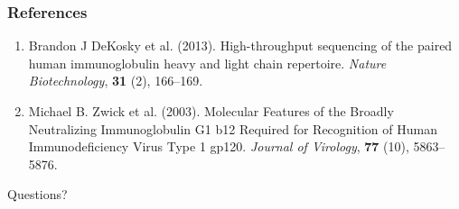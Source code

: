 \documentclass[mathserif,compress]{beamer}
\renewcommand\;{\,}
\begin{document}
\begin{frame}\frametitle{References}
\begin{enumerate}
\item
Brandon J DeKosky et al. (2013).
High-throughput sequencing of the paired human
immunoglobulin heavy and light chain repertoire.
\emph{Nature Biotechnology}, \textbf{31} (2), 166--169.
\bigskip
\item
Michael B. Zwick et al. (2003).
Molecular Features of the Broadly Neutralizing Immunoglobulin G1 b12 Required for Recognition of Human Immunodeficiency Virus Type 1 gp120.
\emph{Journal of Virology}, \textbf{77} (10), 5863--5876.
\end{enumerate}
\end{frame}


\begin{frame}
\begin{center}
\Huge
Questions?
\end{center}
\end{frame}
\end{document}
